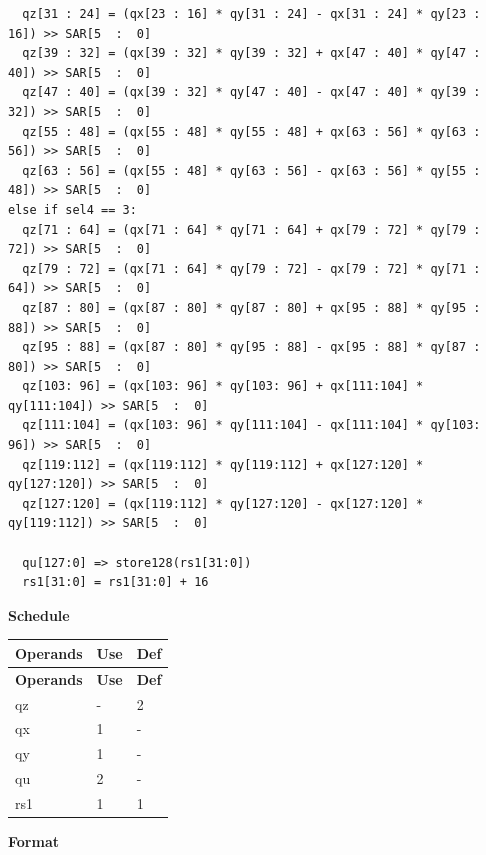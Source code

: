 \begin{lstlisting}
  qz[31 : 24] = (qx[23 : 16] * qy[31 : 24] - qx[31 : 24] * qy[23 : 16]) >> SAR[5  :  0]
  qz[39 : 32] = (qx[39 : 32] * qy[39 : 32] + qx[47 : 40] * qy[47 : 40]) >> SAR[5  :  0]
  qz[47 : 40] = (qx[39 : 32] * qy[47 : 40] - qx[47 : 40] * qy[39 : 32]) >> SAR[5  :  0]
  qz[55 : 48] = (qx[55 : 48] * qy[55 : 48] + qx[63 : 56] * qy[63 : 56]) >> SAR[5  :  0]
  qz[63 : 56] = (qx[55 : 48] * qy[63 : 56] - qx[63 : 56] * qy[55 : 48]) >> SAR[5  :  0]
else if sel4 == 3:
  qz[71 : 64] = (qx[71 : 64] * qy[71 : 64] + qx[79 : 72] * qy[79 : 72]) >> SAR[5  :  0]
  qz[79 : 72] = (qx[71 : 64] * qy[79 : 72] - qx[79 : 72] * qy[71 : 64]) >> SAR[5  :  0]
  qz[87 : 80] = (qx[87 : 80] * qy[87 : 80] + qx[95 : 88] * qy[95 : 88]) >> SAR[5  :  0]
  qz[95 : 88] = (qx[87 : 80] * qy[95 : 88] - qx[95 : 88] * qy[87 : 80]) >> SAR[5  :  0]
  qz[103: 96] = (qx[103: 96] * qy[103: 96] + qx[111:104] * qy[111:104]) >> SAR[5  :  0]
  qz[111:104] = (qx[103: 96] * qy[111:104] - qx[111:104] * qy[103: 96]) >> SAR[5  :  0]
  qz[119:112] = (qx[119:112] * qy[119:112] + qx[127:120] * qy[127:120]) >> SAR[5  :  0]
  qz[127:120] = (qx[119:112] * qy[127:120] - qx[127:120] * qy[119:112]) >> SAR[5  :  0]

  qu[127:0] => store128(rs1[31:0])
  rs1[31:0] = rs1[31:0] + 16
\end{lstlisting}

\textbf{Schedule}\\
\begin{longtable}[c]{|l|l|l|}
    \hline
    \rowcolor{lightgray}
    \textbf{Operands} & \textbf{Use} & \textbf{Def} \\\hline
    \endfirsthead
    \hline
    \rowcolor{lightgray}
     \textbf{Operands} & \textbf{Use} & \textbf{Def} \\\hline
    \endhead
    \hline
    \endfoot


    qz & - & 2 \\\hline
     qx & 1 & - \\\hline
     qy & 1 & - \\\hline
     qu & 2 & - \\\hline
     rs1 & 1 & 1

\end{longtable}

\textbf{Format}\\

